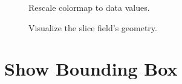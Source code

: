\documentclass[fleqn,11pt,openany]{book}
\begin{document}
\begin{figure}[H]
\caption{Rescale colormap to data values.}
\label{fig:rescale}
\end{figure}

\begin{figure}[H]
\caption{Visualize the slice field's geometry.}
\label{fig:viewscene}
\end{figure}

\section{Show Bounding Box}\label{bbox}
\end{document}
